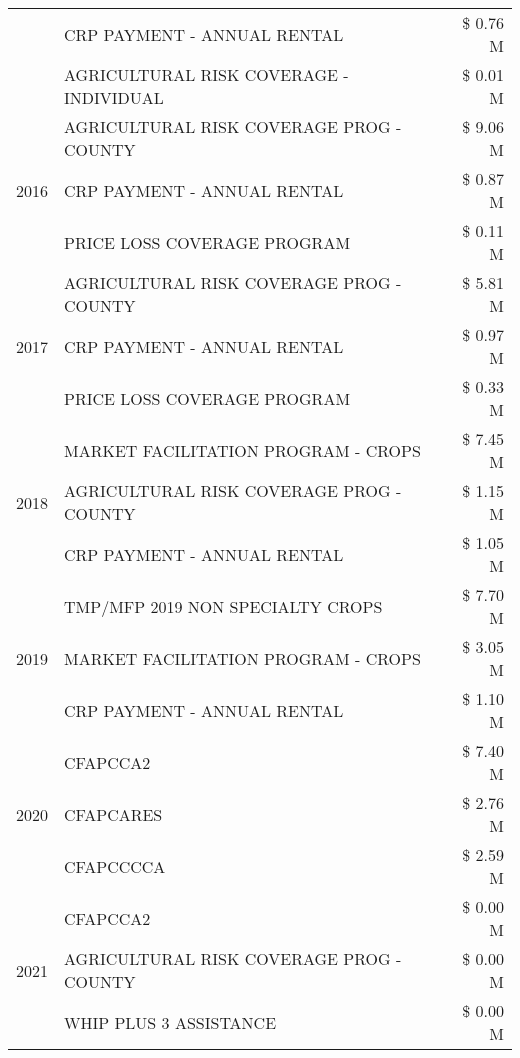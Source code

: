 \begin{tabular}{llr}
 & CRP PAYMENT - ANNUAL RENTAL & \$ 0.76 M \\
 & AGRICULTURAL RISK COVERAGE - INDIVIDUAL & \$ 0.01 M \\
\cline{1-3}
\multirow[t]{3}{*}{2016} & AGRICULTURAL RISK COVERAGE PROG - COUNTY & \$ 9.06 M \\
 & CRP PAYMENT - ANNUAL RENTAL & \$ 0.87 M \\
 & PRICE LOSS COVERAGE PROGRAM & \$ 0.11 M \\
\cline{1-3}
\multirow[t]{3}{*}{2017} & AGRICULTURAL RISK COVERAGE PROG - COUNTY & \$ 5.81 M \\
 & CRP PAYMENT - ANNUAL RENTAL & \$ 0.97 M \\
 & PRICE LOSS COVERAGE PROGRAM & \$ 0.33 M \\
\cline{1-3}
\multirow[t]{3}{*}{2018} & MARKET FACILITATION PROGRAM - CROPS & \$ 7.45 M \\
 & AGRICULTURAL RISK COVERAGE PROG - COUNTY & \$ 1.15 M \\
 & CRP PAYMENT - ANNUAL RENTAL & \$ 1.05 M \\
\cline{1-3}
\multirow[t]{3}{*}{2019} & TMP/MFP 2019 NON SPECIALTY CROPS & \$ 7.70 M \\
 & MARKET FACILITATION PROGRAM - CROPS & \$ 3.05 M \\
 & CRP PAYMENT - ANNUAL RENTAL & \$ 1.10 M \\
\cline{1-3}
\multirow[t]{3}{*}{2020} & CFAPCCA2 & \$ 7.40 M \\
 & CFAPCARES & \$ 2.76 M \\
 & CFAPCCCCA & \$ 2.59 M \\
\cline{1-3}
\multirow[t]{3}{*}{2021} & CFAPCCA2 & \$ 0.00 M \\
 & AGRICULTURAL RISK COVERAGE PROG - COUNTY & \$ 0.00 M \\
 & WHIP PLUS 3 ASSISTANCE & \$ 0.00 M \\
\cline{1-3}
\bottomrule
\end{tabular}
